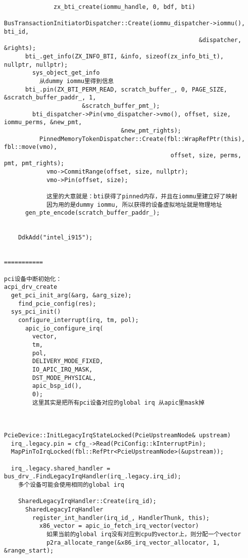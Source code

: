 \begin{verbatim}
              zx_bti_create(iommu_handle, 0, bdf, bti)
                BusTransactionInitiatorDispatcher::Create(iommu_dispatcher->iommu(), bti_id,
                                                       &dispatcher, &rights);
      bti_.get_info(ZX_INFO_BTI, &info, sizeof(zx_info_bti_t), nullptr, nullptr);
        sys_object_get_info
          从dummy iommu里得到信息
      bti_.pin(ZX_BTI_PERM_READ, scratch_buffer_, 0, PAGE_SIZE, &scratch_buffer_paddr_, 1,
                      &scratch_buffer_pmt_);
        bti_dispatcher->Pin(vmo_dispatcher->vmo(), offset, size, iommu_perms, &new_pmt,
                                 &new_pmt_rights);
          PinnedMemoryTokenDispatcher::Create(fbl::WrapRefPtr(this), fbl::move(vmo),
                                               offset, size, perms, pmt, pmt_rights);                                    
            vmo->CommitRange(offset, size, nullptr);
            vmo->Pin(offset, size);

            这里的大意就是：bti获得了pinned内存，并且在iommu里建立好了映射
            因为用的是dummy iommu, 所以获得的设备虚拟地址就是物理地址
      gen_pte_encode(scratch_buffer_paddr_);


    DdkAdd("intel_i915");


===========

pci设备中断初始化：
acpi_drv_create
  get_pci_init_arg(&arg, &arg_size);
    find_pcie_config(res);
  sys_pci_init()
    configure_interrupt(irq, tm, pol);
      apic_io_configure_irq(
        vector,
        tm,
        pol,
        DELIVERY_MODE_FIXED,
        IO_APIC_IRQ_MASK,
        DST_MODE_PHYSICAL,
        apic_bsp_id(),
        0);
        这里其实是把所有pci设备对应的global irq 从apic里mask掉
  


PcieDevice::InitLegacyIrqStateLocked(PcieUpstreamNode& upstream)
  irq_.legacy.pin = cfg_->Read(PciConfig::kInterruptPin);
  MapPinToIrqLocked(fbl::RefPtr<PcieUpstreamNode>(&upstream));

  irq_.legacy.shared_handler = bus_drv_.FindLegacyIrqHandler(irq_.legacy.irq_id);
    多个设备可能会使用相同的global irq

    SharedLegacyIrqHandler::Create(irq_id);
      SharedLegacyIrqHandler
        register_int_handler(irq_id_, HandlerThunk, this);
          x86_vector = apic_io_fetch_irq_vector(vector)
            如果当前的global irq没有对应到cpu的vector上，则分配一个vector
            p2ra_allocate_range(&x86_irq_vector_allocator, 1, &range_start);

            
\end{verbatim}